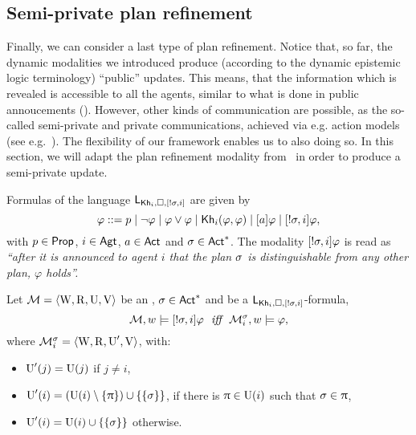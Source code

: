 \subsection{Semi-private plan refinement}
\label{sec:sempriv-planref}

Finally, we can consider a last type of plan refinement. Notice that, so far, the dynamic modalities we introduced produce (according to the dynamic epistemic logic terminology) ``public'' updates. This means, that the information which is revealed is accessible to all the agents, similar to what is done in public annoucements (\cite{Plaza89:lopc}). However, other kinds of communication are possible, as the so-called semi-private and private communications, achieved via e.g. action models (see e.g.~\cite{BR16}). The flexibility of our framework enables us to also doing so. In this section, we will adapt the plan refinement modality from~ in order to produce a semi-private update.

\medskip 

\begin{definition}\label{def:srefgsyntax}
Formulas of the language $\mathsf{L}_{{\sf Kh}_i,\square,[!\sigma,i]}$ are given by
\[
\varphi ::= p \mid \neg\varphi \mid \varphi\vee\varphi \mid {\sf Kh}_i(\varphi,\varphi) \mid [a]\varphi \mid [!\sigma,i]\varphi,
\]
with $p \in {\rm \sf Prop}$, $i\in{\rm \sf Agt}$, $a \in {\rm \sf Act}$ and $\sigma \in {\rm \sf Act}^*$. The modality $[!\sigma,i]\varphi$ is read as \emph{``after it is announced to agent $i$ that the plan $\sigma$ is distinguishable from any other plan, $\varphi$ holds''.}
\end{definition}

\medskip 

\begin{definition}\label{def:srefgsemantics}
Let $\mathcal{M} = \langle \operatorname{W}, \operatorname{R}, \operatorname{U}, \operatorname{V} \rangle$ be an \ults, $\sigma \in {\rm \sf Act}^*$ and  be a $\mathsf{L}_{{\sf Kh}_i,\square,[!\sigma,i]}$-formula, 
\[
\modults,w \models \srefbox{\plan,i}\varphi \ \ \iff \ \ \modults^\plan_i,w \models \varphi,
\]
where $\mathcal{M}^\sigma_i = \langle \operatorname{W},\operatorname{R},\operatorname{U}',\operatorname{V} \rangle$, with:
\begin{itemize}
\item $\operatorname{U}'(j) = \operatorname{U}(j)$ if $j \neq i$,
\item $\operatorname{U}'(i) = (\operatorname{U}(i) \setminus \{ \uppi \}) \cup \{ \{ \sigma \} \}$, if there is $\uppi \in \operatorname{U}(i)$ such that $\sigma \in \uppi$,
\item $\operatorname{U}'(i) = \operatorname{U}(i) \cup \{ \{ \sigma \} \}$ otherwise.
\end{itemize}
\end{definition}

